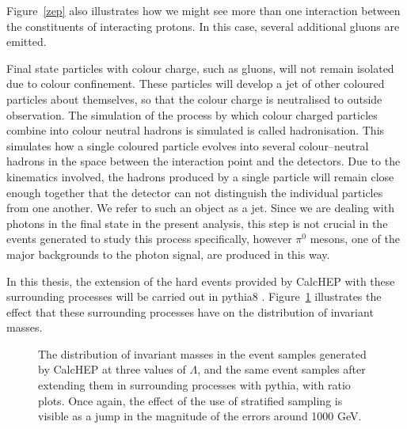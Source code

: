 Figure~\ref{zep} also illustrates how we might see more than one interaction between the constituents of interacting protons. In this case, several additional gluons are emitted.

Final state particles with colour charge, such as gluons, will not remain isolated due to colour confinement. These particles will develop a jet of other coloured particles about themselves, so that the colour charge is neutralised to outside observation. The simulation of the process by which colour charged particles combine into colour neutral hadrons is simulated is called hadronisation. This simulates how a single coloured particle evolves into several colour--neutral hadrons in the space between the interaction point and the detectors. Due to the kinematics involved, the hadrons produced by a single particle will remain close enough together that the detector can not distinguish the individual particles from one another. We refer to such an object as a jet. Since we are dealing with photons in the final state in the present analysis, this step is not crucial in the events generated to study this process specifically, however $\pi^0$ mesons, one of the major backgrounds to the photon signal, are produced in this way. 

In this thesis, the extension of the hard events provided by CalcHEP with these surrounding processes will be carried out in pythia8 \cite{pythia}. Figure~\ref{pythify} illustrates the effect that these surrounding processes have on the distribution of invariant masses.

\begin{figure}[htp]
\centering
\begin{minipage}[b]{.69\textwidth}\hspace{-1.5em}\makebox[0pt][l]{
\noindent\begin{infilsf}
\tiny

\end{infilsf}}
\end{minipage}\hfill
\caption{The distribution of invariant masses in the event samples generated by CalcHEP at three values of $\Lambda$, and the same event samples after extending them in surrounding processes with pythia, with ratio plots. Once again, the effect of the use of stratified sampling is visible as a jump in the magnitude of the errors around 1000 GeV.
\label{pythify}}
\end{figure}

